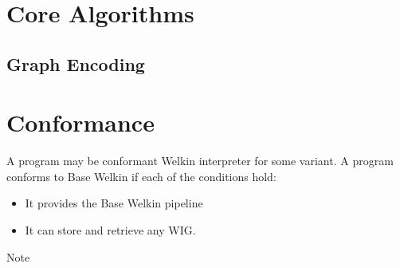

\section{Core Algorithms}

\subsection{Graph Encoding}

\section{Conformance}
A program may be conformant Welkin interpreter for some variant. A program conforms to Base Welkin if each of the conditions hold:
\begin{itemize}
  \item It provides the Base Welkin pipeline
  \item It can store and retrieve any WIG.
\end{itemize}
Note

